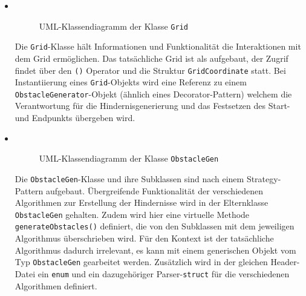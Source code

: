 \begin{itemize}
    \item {} \\
    \begin{figure}[H]
        \vspace{-0.5cm}
        \centering
        
        \caption{UML-Klassendiagramm der Klasse \texttt{Grid}}
        \label{fig:uml_grid}
    \end{figure}
    Die \texttt{Grid}-Klasse hält Informationen und Funktionalität die Interaktionen mit dem Grid ermöglichen.
    Das tatsächliche Grid ist als  aufgebaut, der Zugrif findet über den \texttt{()}
    Operator und die Struktur \texttt{GridCoordinate} statt.
    Bei Instantiierung eines \texttt{Grid}-Objekts wird eine Referenz zu einem \texttt{ObstacleGenerator}-Objekt (ähnlich eines Decorator-Pattern)
    welchem die Verantwortung für die Hindernisgenerierung und das Festsetzen des Start- und Endpunkts übergeben wird.
    \newpage
    \item {} \\
    \begin{figure}[H]
        \vspace{-0.5cm}
        \centering
        
        \caption{UML-Klassendiagramm der Klasse \texttt{ObstacleGen}}
        \label{fig:uml_obstacle_gen}
    \end{figure}
    Die \texttt{ObstacleGen}-Klasse und ihre Subklassen sind nach einem Strategy-Pattern aufgebaut.
    Übergreifende Funktionalität der verschiedenen Algorithmen zur Erstellung der Hindernisse wird in der Elternklasse \texttt{ObstacleGen} gehalten.
    Zudem wird hier eine virtuelle Methode \texttt{generateObstacles()} definiert, die von den Subklassen mit dem jeweiligen Algorithmus überschrieben wird.
    Für den Kontext ist der tatsächliche Algorithmus dadurch irrelevant, es kann mit einem generischen Objekt vom Typ \texttt{ObstacleGen} gearbeitet werden.
    Zusätzlich wird in der gleichen Header-Datei ein \texttt{enum} und ein dazugehöriger Parser-\texttt{struct} für die verschiedenen Algorithmen definiert.
\end{itemize}
